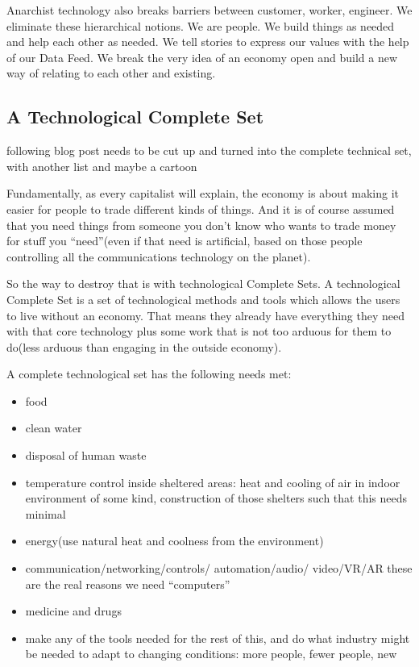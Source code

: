 Anarchist technology also breaks barriers between customer, worker,
engineer. We eliminate these hierarchical notions. We are people. We
build things as needed and help each other as needed. We tell stories to
express our values with the help of our Data Feed. We break the very
idea of an economy open and build a new way of relating to each other
and existing.

\subsection{A Technological Complete
Set}\label{a-technological-complete-set}

following blog post needs to be cut up and turned into the complete
technical set, with another list and maybe a cartoon

Fundamentally, as every capitalist will explain, the economy is about
making it easier for people to trade different kinds of things. And it
is of course assumed that you need things from someone you don't know
who wants to trade money for stuff you ``need''(even if that need is
artificial, based on those people controlling all the communications
technology on the planet).

So the way to destroy that is with technological Complete Sets. A
technological Complete Set is a set of technological methods and tools
which allows the users to live without an economy. That means they
already have everything they need with that core technology plus some
work that is not too arduous for them to do(less arduous than engaging
in the outside economy).

A complete technological set has the following needs met:

\begin{itemize}
\tightlist
\item
  food
\item
  clean water
\item
  disposal of human waste
\item
  temperature control inside sheltered areas: heat and cooling of air in
  indoor environment of some kind, construction of those shelters such
  that this needs minimal\\
\item
  energy(use natural heat and coolness from the environment)
\item
  communication/networking/controls/ automation/audio/ video/VR/AR these
  are the real reasons we need ``computers''
\item
  medicine and drugs
\item
  make any of the tools needed for the rest of this, and do what
  industry might be needed to adapt to changing conditions: more people,
  fewer people, new
\end{itemize}

